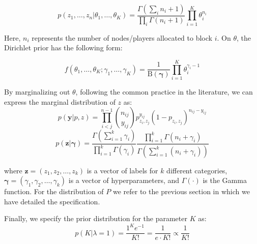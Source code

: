 \documentclass[11pt]{amsart}
\begin{document}
\begin{equation}
p(z_1, \ldots , z_n| \theta_1, \ldots, \theta_K ) = \frac{\Gamma(\sum_i n_i + 1)}{\prod_i \Gamma(n_i+1)} \prod_{i=1}^K \theta_i^{n_i}
\end{equation}

Here, $n_i$ represents the number of nodes/players allocated to block $i$. On $\theta$, the Dirichlet prior has the following form:

\begin{equation}
f \left(\theta_1,\ldots, \theta_{K}; \gamma_1,\ldots, \gamma_K \right) = \frac{1}{\mathrm{B}(\boldsymbol\gamma)} \prod_{i=1}^K \theta_i^{\gamma_i - 1}
\end{equation}

By marginalizing out $\theta$, following the common practice in the literature, we can express the marginal distribution of $z$ as:
\begin{equation}
p(\textbf{y} | p, z) = \prod_{i<j}^{n-1} {n_{ij} \choose y_{ij}} p_{z_i, z_j}^{y_{ij}}(1- p_{z_i, z_j})^{n_{ij}-y_{ij}}
\end{equation}
\begin{equation} p(\mathbf{z}|\boldsymbol{\gamma}) = \frac{\Gamma(\sum_{i=1}^k \gamma_i)}{\prod_{i=1}^k \Gamma(\gamma_i)}\frac{\prod_{i=1}^k \Gamma(n_i+\gamma_i)}{\Gamma(\sum_{i=1}^k (n_i+\gamma_i))}
\end{equation}

where $\mathbf{z} = (z_1, z_2, \dots, z_k)$ is a vector of labels for $k$ different categories, $\boldsymbol{\gamma} = (\gamma_1, \gamma_2, \dots, \gamma_k)$ is a vector of hyperparameters, and $\Gamma(\cdot)$ is the Gamma function.
For the distribution of $P$ we refer to the previous section in which we have detailed the specification. 

Finally, we specify the prior distribution for the parameter $K$ as:
\begin{equation}
p(K| \lambda =1) = \frac{1^K e^{-1}}{K!} =  \frac{1}{e\cdot K!} \propto \frac{1}{ K!}
\end{equation}
\end{document}
